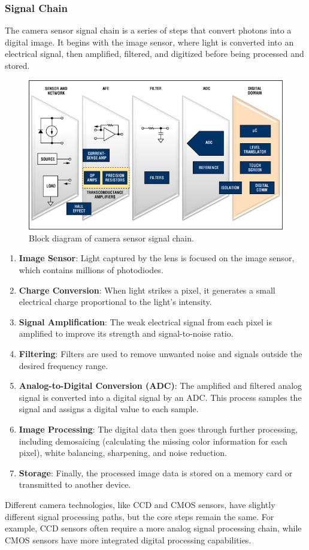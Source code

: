 \documentclass[10pt]{article}
\begin{document}
\begin{multicols}{2}
\subsubsection{Signal Chain}
The camera sensor signal chain is a series of steps that convert photons into a digital image. It begins with the image sensor, where light is converted into an electrical signal, then amplified, filtered, and digitized before being processed and stored.
\begin{figure}[H]
    \centering
    \includegraphics[width=1\linewidth]{Images/Week 2/photodiode-chain.jpg}
    \caption{Block diagram of camera sensor signal chain.}
\end{figure}
\begin{enumerate}
    \item \textbf{Image Sensor}: Light captured by the lens is focused on the image sensor, which contains millions of photodiodes.
    \item \textbf{Charge Conversion}: When light strikes a pixel, it generates a small electrical charge proportional to the light's intensity.
    \item \textbf{Signal Amplification}: The weak electrical signal from each pixel is amplified to improve its strength and signal-to-noise ratio.
    \item \textbf{Filtering}: Filters are used to remove unwanted noise and signals outside the desired frequency range. 
    \item \textbf{Analog-to-Digital Conversion (ADC)}: The amplified and filtered analog signal is converted into a digital signal by an ADC. This process samples the signal and assigns a digital value to each sample.
    \item \textbf{Image Processing}: The digital data then goes through further processing, including demosaicing (calculating the missing color information for each pixel), white balancing, sharpening, and noise reduction.
    \item \textbf{Storage}: Finally, the processed image data is stored on a memory card or transmitted to another device. 
\end{enumerate}
Different camera technologies, like CCD and CMOS sensors, have slightly different signal processing paths, but the core steps remain the same. For example, CCD sensors often require a more analog signal processing chain, while CMOS sensors have more integrated digital processing capabilities. 


\end{multicols}
\end{document}

